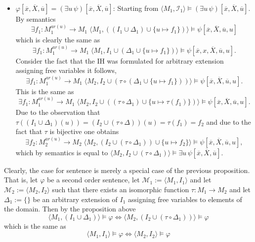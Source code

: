 \documentclass[11pt,a4paper]{article}
\begin{document}
\begin{itemize}[leftmargin=*]
\item  $\varphi[\overline{x}, \overline{X}, \overline{u}] = (\exists u \, \psi)[\overline{x}, \overline{X}, \overline{u}]$: Starting from $\langle M_1, \mathcal{I}_1 \rangle \models (\exists u \, \psi)[\overline{x}, \overline{X}, \overline{u}]$. By semantics  
\begin{equation*}
\exists f_1 : M_1^{ar(u)} \to M_1 \; \langle M_1 , ((I_1 \cup \Delta_1) \cup \{u \mapsto f_1\}) \rangle \models \psi[\overline{x}, \overline{X}, \overline{u}, u]
\end{equation*}
which is clearly the same as
\begin{equation*}
\exists f_1 : M_1^{ar(u)} \to M_1 \; \langle M_1 , I_1 \cup (\Delta_1 \cup \{u \mapsto f_1\}) \rangle \models \psi[\overline{x},x, \overline{X}, \overline{u}, u].
\end{equation*}
Consider the fact that the IH was formulated for arbitrary extension assigning free variables it follows,
 \begin{equation*}
\exists   f_1 : M_1^{ar(u)} \to M_1\;  \langle M_2 , I_2 \cup (\tau \circ (\Delta_1 \cup \{u \mapsto f_1\})) \rangle \models \psi[\overline{x}, \overline{X}, \overline{u}, u].
\end{equation*} 
This is the same as 
\begin{equation*}
\exists  f_1 : M_1^{ar(u)} \to M_1 \;  \langle M_2 , I_2 \cup ((\tau \circ \Delta_1) \cup \{u \mapsto \tau(f_1)\}) \rangle \models \psi[\overline{x}, \overline{X}, \overline{u}, u].
\end{equation*}
Due to the observation that $\tau((I_1 \cup \Delta_1)(u))=(I_2 \cup (\tau \circ \Delta))(u)=\tau(f_1)=f_2$ and due to the fact that $\tau$ is bijective one obtains
\begin{equation*}
\exists  f_2 : M_2^{ar(u)} \to M_2 \;  \langle M_2 , (I_2 \cup (\tau \circ \Delta_1)) \cup \{u \mapsto f_2 \} \rangle \models \psi[\overline{x}, \overline{X}, \overline{u}, u],
\end{equation*}
which by semantics is equal to $\langle M_2 , I_2 \cup (\tau \circ \Delta_1)\rangle \models \exists u \, \psi[\overline{x}, \overline{X}, \overline{u}]$. \\


\end{itemize}


Clearly, the case for sentence is merely a special case of the previous proposition. That is,
let $\varphi$ be a second order sentence, let $\mathcal{M}_1 := \langle M_1, I_1\rangle$ and let $\mathcal{M}_2 := \langle M_2, I_2\rangle$ such that there exists an isomorphic function $\tau : M_1 \to M_2$ and let $\Delta_1:= \{\}$ be an arbitrary extension of $I_1$ assigning free variables to elements of the domain. Then by the proposition above 
\begin{equation*}
\langle M_1, (I_1 \cup \Delta_1) \rangle \models \varphi \iff \langle M_2, (I_2 \cup (\tau \circ \Delta_1)) \rangle \models \varphi
\end{equation*} 
which is the same as
\begin{equation*}
\langle M_1, I_1 \rangle \models \varphi \iff \langle M_2, I_2 \rangle \models \varphi
\end{equation*} 
\end{document}
